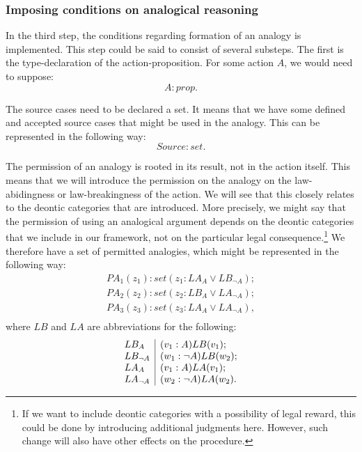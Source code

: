 		\subsubsection{Imposing conditions on analogical reasoning}
		
		In the third step, the conditions regarding formation of an analogy is implemented. This step could be said to consist of several substeps. The first is the type-declaration of the action-proposition. For some action $A$, we would need to suppose:
			\[
				A : prop.
			\]
		
		The source cases need to be declared a set. It means that we have some defined and accepted source cases that might be used in the analogy. This can be represented in the following way:
			\[   
				Source : set.
			\]
		
		The permission of an analogy is rooted in its result, not in the action itself. This means that we will introduce the permission on the analogy on the law-abidingness or law-breakingness of the action. We will see that this closely relates to the deontic categories that are introduced. More precisely, we might say that the permission of using an analogical argument depends on the deontic categories that we include in our framework, not on the particular legal consequence.\footnote{If we want to include deontic categories with a possibility of legal reward, this could be done by introducing additional judgments here. However, such change will also have other effects on the procedure.} We therefore have a set of permitted analogies, which might be represented in the following way:
			\[
			\begin{array}{l}
				PA_1(z_1) : set (z_1 : LA_A \lor LB_{\neg A}); \\
				PA_2(z_2) : set (z_2 : LB_A \lor LA_{\neg A}); \\
				PA_3(z_3) : set (z_3 : LA_A \lor LA_{\neg A}), \\
			\end{array}
			\]
		where $LB$ and $LA$ are abbreviations for the following:
			\[
			\begin{array}{l | l}
				LB_A        & (v_1 : A) LB(v_1);      \\
				LB_{\neg A} & (w_1 : \neg A) LB(w_2); \\
				LA_A        & (v_1 : A) LA(v_1);      \\
				LA_{\neg A} & (w_2 : \neg A) LA(w_2).
			\end{array}
			\]
			

